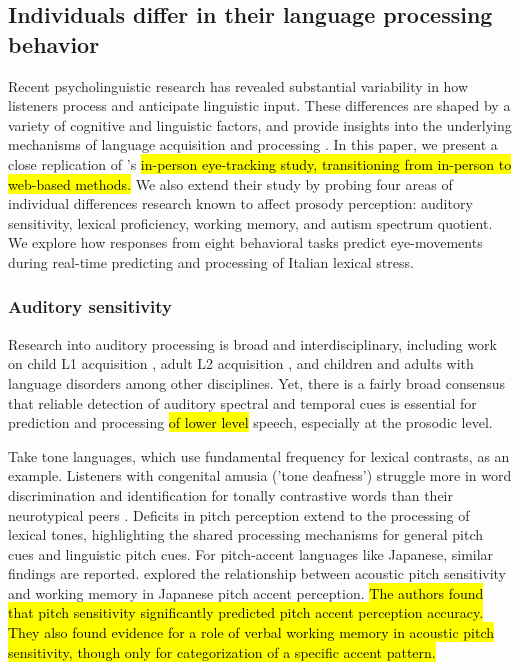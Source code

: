 \subsection{Individuals differ in their language processing behavior}

Recent psycholinguistic research has revealed substantial variability in how listeners process and anticipate linguistic input. These differences are shaped by a variety of cognitive and linguistic factors, and provide insights into the underlying mechanisms of language acquisition and processing \citep{Huettig2016, Kidd2018}. In this paper, we present a close replication of \cite{Sulpizio_McQueen_2012}'s \hl{in-person eye-tracking study, transitioning from in-person to web-based methods.} We also extend their study by probing four areas of individual differences research known to affect prosody perception: auditory sensitivity, lexical proficiency, working memory, and autism spectrum quotient. We explore how responses from eight behavioral tasks predict eye-movements during real-time predicting and processing of Italian lexical stress.

\subsubsection{Auditory sensitivity}
Research into auditory processing is broad and interdisciplinary, including work on child L1 acquisition \citep{benasich2002infant}, adult L2 acquisition \citep{lengeris2010effect, kempe2012individual}, and children and adults with language disorders \citep{Liu2018, goswami2013impaired} among other disciplines. Yet, there is a fairly broad consensus that reliable detection of auditory spectral and temporal cues is essential for prediction and processing \hl{of lower level} speech, especially at the prosodic level. 

Take tone languages, which use fundamental frequency for lexical contrasts, as an example. Listeners with congenital amusia ('tone deafness') struggle more in word discrimination and identification for tonally contrastive words than their neurotypical peers \citep{nan_2010, zhu2023tone}. Deficits in pitch perception extend to the processing of lexical tones, highlighting the shared processing mechanisms for general pitch cues and linguistic pitch cues. For pitch-accent languages like Japanese, similar findings are reported. \cite{goss_2014} explored the relationship between acoustic pitch sensitivity and working memory in Japanese pitch accent perception. \hl{The authors found that pitch sensitivity significantly predicted pitch accent perception accuracy. They also found evidence for a role of verbal working memory in acoustic pitch sensitivity, though only for categorization of a specific accent pattern.}

